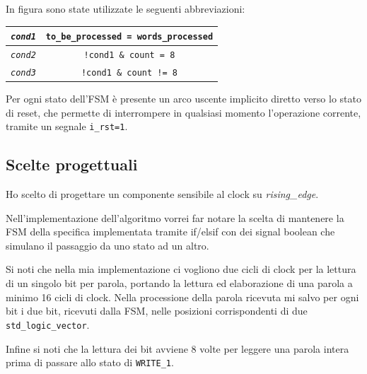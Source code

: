 \documentclass{article}
\begin{document}
In figura sono state utilizzate le seguenti abbreviazioni:
\vspace{-.1cm}
    \def\arraystretch{1.2} %
    \begin{tabular}{||c|c||}
        \hline
        \texttt{\emph{cond1}} & \texttt{to\_be\_processed = words\_processed}                  \\\hline
        \texttt{\emph{cond2}} & \texttt{!cond1 \& count = 8}                                             \\\hline
        \texttt{\emph{cond3}} & \texttt{!cond1 \& count != 8}                                             \\\hline
    \end{tabular}
\vspace{0,2cm}

Per ogni stato dell'FSM è presente un arco uscente implicito diretto verso lo stato di reset, che permette di interrompere in qualsiasi momento l'operazione corrente, tramite un segnale \texttt{i\_rst=1}.
\vspace{0,2cm}

\subsection{Scelte progettuali} %
Ho scelto di progettare un componente sensibile al clock su \emph{rising\_edge}.\par
Nell’implementazione dell’algoritmo vorrei far notare la scelta di mantenere la FSM della specifica implementata tramite if/elsif con dei signal boolean che simulano il passaggio da uno stato ad un altro.

Si noti che nella mia implementazione ci vogliono due cicli di clock per la lettura di un singolo bit per parola, portando la lettura ed elaborazione di una parola a minimo 16 cicli di clock.
Nella processione della parola ricevuta mi salvo per ogni bit i due bit, ricevuti dalla FSM, nelle posizioni corrispondenti di due \texttt{std\_logic\_vector}.

Infine si noti che la lettura dei bit avviene 8 volte per leggere una parola intera prima di passare allo stato di \texttt{WRITE\_1}.

\pagebreak
\end{document}
